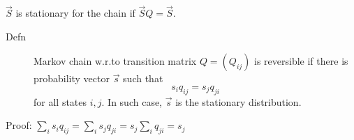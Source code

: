 \begin{slide}
$\vec{S}$  is stationary for the chain if $\vec{S}Q = \vec{S}$.


\end{slide}
\begin{slide}
\begin{description}
  \item[Defn] Markov chain w.r.to transition matrix $Q =(Q_{ij})$ is reversible if there is  probability vector $\vec{s}$ such that 
$$s_iq_{ij} = s_jq_{ji}$$ for all states $i,j$. In such case, $\vec{s}$ is the stationary distribution.
\end{description}
Proof: $\sum_is_iq_{ij} = \sum_is_jq_{ji} = s_j\sum_iq_{ji} = s_j$

\end{slide}
